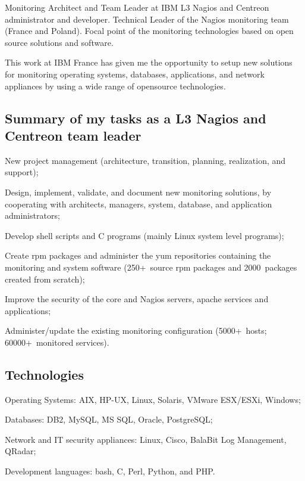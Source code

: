 
\bigskip
{}
   {Monitoring Architect and Team Leader at IBM}
L3 Nagios and Centreon administrator and developer.
Technical Leader of the Nagios monitoring team (France and Poland).
Focal point of the monitoring technologies based on open source solutions and
software.

This work at IBM France has given me the opportunity to setup new solutions 
for monitoring operating systems, databases, applications, and network 
appliances by using a wide range of opensource technologies.

\subsection{Summary of my tasks as a L3 Nagios and Centreon team leader}

\item{\bdot} New project management (architecture, transition, planning, 
   realization, and support);
\item{\bdot} Design, implement, validate, and document new monitoring solutions,
   by cooperating with architects, managers, system, database, and application 
   administrators;
\item{\bdot} Develop shell scripts and C programs (mainly Linux system level
   programs);
\item{\bdot} Create rpm packages and administer the yum repositories containing
   the monitoring and system software (250+~source rpm packages and  
   2000~packages created from scratch);
\item{\bdot} Improve the security of the core and Nagios servers, apache 
   services and applications;
\item{\bdot} Administer/update the existing monitoring configuration 
   (5000+~hosts; 60000+~monitored services).

\subsection{Technologies}

\item{\bdot} Operating Systems: AIX, HP-UX, Linux, Solaris, VMware ESX/ESXi, Windows;
\item{\bdot} Databases: DB2, MySQL, MS SQL, Oracle, PostgreSQL;
\item{\bdot} Network and IT security appliances: Linux, Cisco, BalaBit Log Management, 
   QRadar;
\item{\bdot} Development languages: bash, C, Perl, Python, and PHP.

